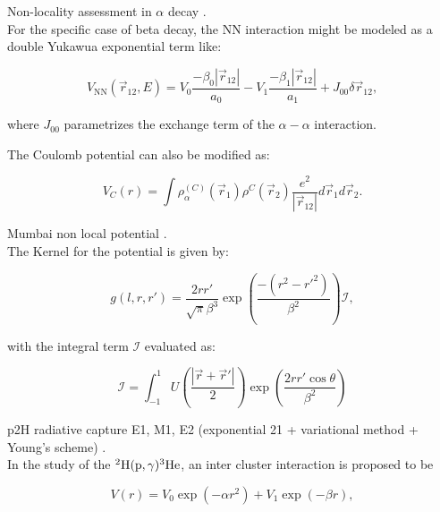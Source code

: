\documentclass[openany]{book}
\begin{document}
Non-locality assessment in $\alpha$ decay \cite{perez_velasquez_kelkar_upadhyay_2019}. \\

For the specific case of beta decay, the NN interaction might be modeled as a double Yukawua exponential term like: 

\begin{equation}\label{potential_nonLocal_M3Y}
	V_{\mathrm{NN}}(\vec r_{12}, E) = V_0 \frac{-\beta_0 |\vec r_{12}|}{a_0} - V_1 \frac{-\beta_1 |\vec r_{12}|}{a_1} + J_{00}\delta{\vec r_{12}},
\end{equation}

where $J_{00}$ parametrizes the exchange term of the $\alpha-\alpha$ interaction.

The Coulomb potential can also be modified as: 

\begin{equation}\label{potential_nonLocal_coulomb}
	V_{C}(r) = \int \rho^{(C)}_\alpha(\vec r_1) \rho^{{C}}(\vec r_2) \frac{e^2}{|\vec r_{12}|} d\vec r_1 d\vec r_2.
\end{equation}


Mumbai non local potential \cite{upadhyay_bhagwat_jain_2017}. \\

The Kernel for the potential is given by: 

\begin{equation}\label{potential_nonLocal_Mumbai_kernel}
	g(l, r, r') = \frac{2rr'}{\sqrt{\pi}\beta^3} \exp {\left(\frac{-(r^2 - r'^2)}{\beta^2}\right)} \mathcal{I},
\end{equation}

with the integral term $\mathcal{I}$ evaluated as: 

\begin{equation}\label{potential_nonLocal_Mumbai_kernel_integral}
	\mathcal{I} = \int_{-1}^{1}{U \left(\frac{|\vec r + \vec r'|}{2} \right) \exp \left(\frac{2rr'\cos \theta}{\beta^2}\right)}
\end{equation}

p2H radiative capture E1, M1, E2 (exponential 21 + variational method + Young's scheme) \cite{dubovichenko_dzhazairov-kakhramanov_2009}. \\

In the study of the $\mathrm{{}^{2}H(p, \gamma){}^{3}He}$, an inter cluster interaction is proposed to be 


\begin{equation}\label{eq:potential_intercluster_12}
		V(r) = V_0 \exp (-\alpha r^2) + V_1 \exp (-\beta r),
\end{equation}
\end{document}
